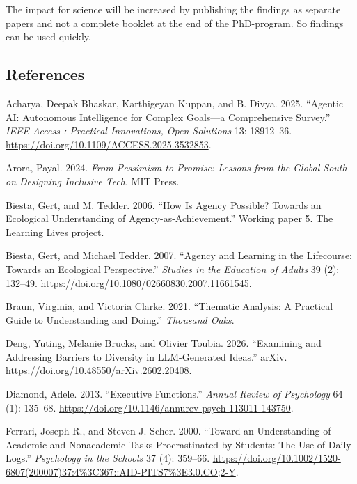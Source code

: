\documentclass[
  letterpaper,
  DIV=11,
  numbers=noendperiod]{scrartcl}
\newlength{\cslhangindent}
\newenvironment{CSLReferences}[2] %
 {\begin{list}{}{%
  \setlength{\itemindent}{0pt}
  \setlength{\leftmargin}{0pt}
  \setlength{\parsep}{0pt}
  \ifodd #1
   \setlength{\leftmargin}{\cslhangindent}
   \setlength{\itemindent}{-1\cslhangindent}
  \fi
  \setlength{\itemsep}{#2\baselineskip}}}
 {\end{list}}
\begin{document}
The impact for science will be increased by publishing the findings as
separate papers and not a complete booklet at the end of the
PhD-program. So findings can be used quickly.

\subsection*{References}\label{references}

\label{refs}
\begin{CSLReferences}{1}{0}
Acharya, Deepak Bhaskar, Karthigeyan Kuppan, and B. Divya. 2025.
{``Agentic {AI}: {Autonomous} Intelligence for Complex Goals---a
Comprehensive Survey.''} \emph{IEEE Access : Practical Innovations, Open
Solutions} 13: 18912--36.
\url{https://doi.org/10.1109/ACCESS.2025.3532853}.

Arora, Payal. 2024. \emph{From Pessimism to Promise: {Lessons} from the
{Global South} on Designing Inclusive Tech}. MIT Press.

Biesta, Gert, and M. Tedder. 2006. {``How Is Agency Possible? {Towards}
an Ecological Understanding of Agency-as-Achievement.''} Working paper
5. The Learning Lives project.

Biesta, Gert, and Michael Tedder. 2007. {``Agency and Learning in the
Lifecourse: {Towards} an Ecological Perspective.''} \emph{Studies in the
Education of Adults} 39 (2): 132--49.
\url{https://doi.org/10.1080/02660830.2007.11661545}.

Braun, Virginia, and Victoria Clarke. 2021. {``Thematic Analysis: A
Practical Guide to Understanding and Doing.''} \emph{Thousand Oaks}.

Deng, Yuting, Melanie Brucks, and Olivier Toubia. 2026. {``Examining and
{Addressing Barriers} to {Diversity} in {LLM-Generated Ideas}.''} arXiv.
\url{https://doi.org/10.48550/arXiv.2602.20408}.

Diamond, Adele. 2013. {``Executive {Functions}.''} \emph{Annual Review
of Psychology} 64 (1): 135--68.
\url{https://doi.org/10.1146/annurev-psych-113011-143750}.

Ferrari, Joseph R., and Steven J. Scher. 2000. {``Toward an
Understanding of Academic and Nonacademic Tasks Procrastinated by
Students: {The} Use of Daily Logs.''} \emph{Psychology in the Schools}
37 (4): 359--66.
\url{https://doi.org/10.1002/1520-6807(200007)37:4\%3C367::AID-PITS7\%3E3.0.CO;2-Y}.


\end{CSLReferences}
\end{document}
